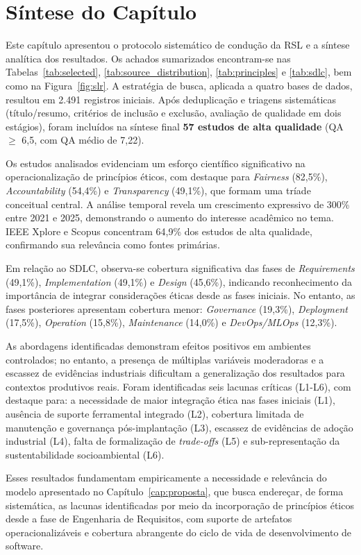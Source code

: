 \section{Síntese do Capítulo}

Este capítulo apresentou o protocolo sistemático de condução da \acrshort{RSL} e a síntese analítica dos resultados. Os achados sumarizados encontram-se nas Tabelas~\ref{tab:selected}, \ref{tab:source_distribution}, \ref{tab:principles} e \ref{tab:sdlc}, bem como na Figura~\ref{fig:slr}. A estratégia de busca, aplicada a quatro bases de dados, resultou em 2.491 registros iniciais. Após deduplicação e triagens sistemáticas (título/resumo, critérios de inclusão e exclusão, avaliação de qualidade em dois estágios), foram incluídos na síntese final \textbf{57 estudos de alta qualidade} (QA $\geq$ 6,5, com QA médio de 7,22).

Os estudos analisados evidenciam um esforço científico significativo na operacionalização de princípios éticos, com destaque para \textit{Fairness} (82,5\%), \textit{Accountability} (54,4\%) e \textit{Transparency} (49,1\%), que formam uma tríade conceitual central. A análise temporal revela um crescimento expressivo de 300\% entre 2021 e 2025, demonstrando o aumento do interesse acadêmico no tema. IEEE Xplore e Scopus concentram 64,9\% dos estudos de alta qualidade, confirmando sua relevância como fontes primárias.

Em relação ao SDLC, observa-se cobertura significativa das fases de \textit{Requirements} (49,1\%), \textit{Implementation} (49,1\%) e \textit{Design} (45,6\%), indicando reconhecimento da importância de integrar considerações éticas desde as fases iniciais. No entanto, as fases posteriores apresentam cobertura menor: \textit{Governance} (19,3\%), \textit{Deployment} (17,5\%), \textit{Operation} (15,8\%), \textit{Maintenance} (14,0\%) e \textit{DevOps/MLOps} (12,3\%).

As abordagens identificadas demonstram efeitos positivos em ambientes controlados; no entanto, a presença de múltiplas variáveis moderadoras e a escassez de evidências industriais dificultam a generalização dos resultados para contextos produtivos reais. Foram identificadas seis lacunas críticas (L1-L6), com destaque para: a necessidade de maior integração ética nas fases iniciais (L1), ausência de suporte ferramental integrado (L2), cobertura limitada de manutenção e governança pós-implantação (L3), escassez de evidências de adoção industrial (L4), falta de formalização de \textit{trade-offs} (L5) e sub-representação da sustentabilidade socioambiental (L6).

Esses resultados fundamentam empiricamente a necessidade e relevância do modelo apresentado no Capítulo~\ref{cap:proposta}, que busca endereçar, de forma sistemática, as lacunas identificadas por meio da incorporação de princípios éticos desde a fase de Engenharia de Requisitos, com suporte de artefatos operacionalizáveis e cobertura abrangente do ciclo de vida de desenvolvimento de software.
